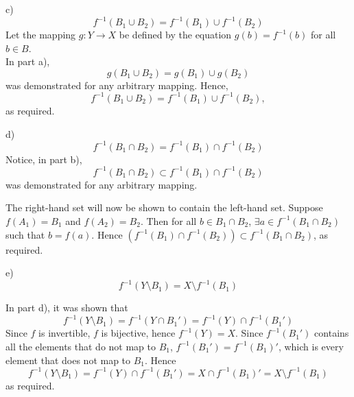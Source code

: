 \documentclass[
	12pt, %
]{fphw}
\newcommand\qed{\text{$\blacksquare$}}
\begin{document}
\newpage

\noindent
c)$$f^{-1}(B_1 \cup B_2) = f^{-1}(B_1) \cup f^{-1}(B_2)$$
Let the mapping $g : Y \to X$ be defined by the equation $g(b) = f^{-1}(b)$ for all $b \in B$. \\
In part a), 
$$
g(B_1 \cup B_2)=g(B_1) \cup g(B_2)
$$
was demonstrated for any arbitrary mapping. Hence,
$$f^{-1}(B_1 \cup B_2) = f^{-1}(B_1) \cup f^{-1}(B_2),$$
as required. \qed

\vspace{20 pt}
\noindent
d)$$f^{-1}(B_1 \cap B_2) = f^{-1}(B_1) \cap f^{-1}(B_2)$$
Notice, in part b),
$$f^{-1}(B_1 \cap B_2) \subset f^{-1}(B_1) \cap f^{-1}(B_2)$$
was demonstrated for any arbitrary mapping. 

The right-hand set will now be shown to contain the left-hand set. Suppose $f(A_1) = B_1$ and $f(A_2) = B_2$. Then for all $b \in B_1 \cap B_2$, $\exists a \in f^{-1}(B_1 \cap B_2)$ such that $b = f(a)$. Hence $(f^{-1}(B_1) \cap f^{-1}(B_2)) \subset f^{-1}(B_1 \cap B_2)$,  as required. \qed

\vspace{20 pt}
\noindent
e)$$f^{-1}(Y \setminus B_1) = X \setminus f^{-1}(B_1)$$

\noindent
In part d), it was shown that
$$f^{-1}(Y \setminus B_1) = f^{-1}(Y \cap B_1') = f^{-1}(Y) \cap f^{-1}(B_1')$$
Since $f$ is invertible, $f$ is bijective, hence $f^{-1}(Y) = X$. Since $f^{-1}(B_1')$ contains all the elements that do not map to $B_1$, $f^{-1}(B_1') = f^{-1}(B_1)'$, which is every element that does not map to $B_1$. Hence
$$
f^{-1}(Y \setminus B_1) = f^{-1}(Y) \cap f^{-1}(B_1') = X \cap f^{-1}(B_1)' = X \setminus f^{-1}(B_1)
$$
as required. \qed
\end{document}
